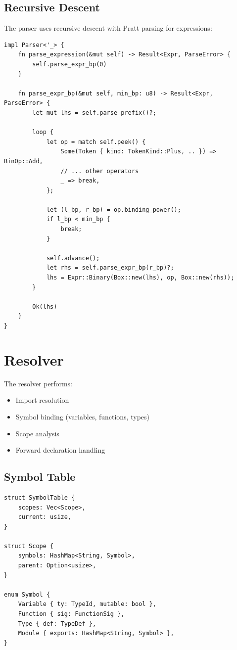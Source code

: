 \subsection{Recursive Descent}

The parser uses recursive descent with Pratt parsing for expressions:

\begin{lstlisting}[language={}]
impl Parser<'_> {
    fn parse_expression(&mut self) -> Result<Expr, ParseError> {
        self.parse_expr_bp(0)
    }

    fn parse_expr_bp(&mut self, min_bp: u8) -> Result<Expr, ParseError> {
        let mut lhs = self.parse_prefix()?;

        loop {
            let op = match self.peek() {
                Some(Token { kind: TokenKind::Plus, .. }) => BinOp::Add,
                // ... other operators
                _ => break,
            };

            let (l_bp, r_bp) = op.binding_power();
            if l_bp < min_bp {
                break;
            }

            self.advance();
            let rhs = self.parse_expr_bp(r_bp)?;
            lhs = Expr::Binary(Box::new(lhs), op, Box::new(rhs));
        }

        Ok(lhs)
    }
}
\end{lstlisting}

\section{Resolver}

The resolver performs:
\begin{itemize}
    \item Import resolution
    \item Symbol binding (variables, functions, types)
    \item Scope analysis
    \item Forward declaration handling
\end{itemize}

\subsection{Symbol Table}

\begin{lstlisting}[language={}]
struct SymbolTable {
    scopes: Vec<Scope>,
    current: usize,
}

struct Scope {
    symbols: HashMap<String, Symbol>,
    parent: Option<usize>,
}

enum Symbol {
    Variable { ty: TypeId, mutable: bool },
    Function { sig: FunctionSig },
    Type { def: TypeDef },
    Module { exports: HashMap<String, Symbol> },
}
\end{lstlisting}


